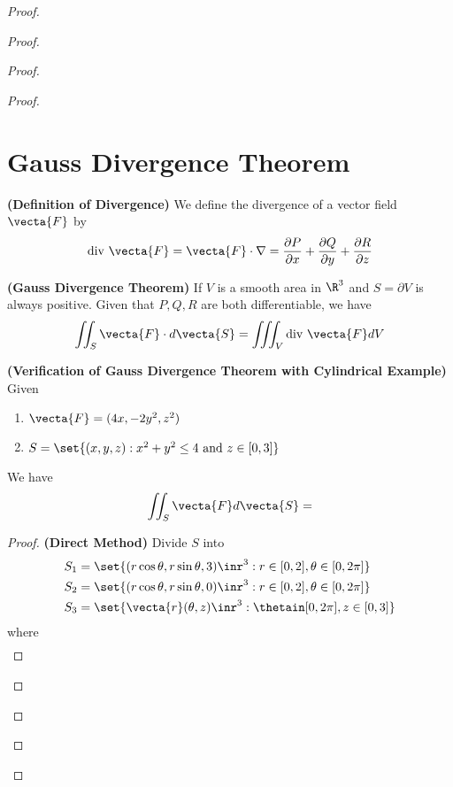 \documentclass{report}
\begin{document}
\begin{proof}
\begin{proof}
\begin{proof}
\begin{proof}
\section{Gauss Divergence Theorem}
\begin{definition}
\textbf{(Definition of Divergence)} We define the divergence of a vector field $\vecta{F}$ by 
\begin{align*}
\text{div }\vecta{F}= \vecta{F} \cdot \nabla = \frac{\partial P}{\partial x}+ \frac{\partial Q}{\partial y}+\frac{\partial R}{\partial z} 
\end{align*}
\end{definition}
\begin{theorem}
\textbf{(Gauss Divergence Theorem)} If $V$ is a smooth area in  $\R^3$ and  $S=\partial V$ is always positive. Given that $P,Q,R$ are both differentiable, we have 
 \begin{align*}
\iint_S \vecta{F}\cdot d\vecta{S}=\iiint_V \text{div }\vecta{F}dV
\end{align*}
\end{theorem}
\begin{theorem}
\textbf{(Verification of Gauss Divergence Theorem with Cylindrical Example)} Given 
\begin{enumerate}[label=(\alph*)]
  \item $\vecta{F}=(4x,-2y^2,z^2)$ 
  \item $S=\set{(x,y,z):x^2+y^2\leq 4 \text{ and } z\in [0,3]}$
\end{enumerate}
We have 
\begin{align*}
\iint_S \vecta{F} d\vecta{S}=
\end{align*}
\end{theorem}
\begin{proof}
\textbf{(Direct Method)}
Divide $S$ into 
 \begin{align*}
S_1&=\set{(r\cos \theta ,r \sin \theta,3)\inr^3:r\in [0,2], \theta \in [0,2\pi]}\\
S_2&=\set{(r\cos \theta,r \sin \theta ,0)\inr^3:r\in [0,2],\theta \in [0,2\pi]}\\
S_3&=\set{\vecta{r}(\theta,z)\inr^3: \thetain [0,2\pi],z\in [0,3]}
\end{align*}
where
\begin{align*}

\end{align*}
\end{proof}
\end{proof}
\end{proof}
\end{proof}
\end{proof}
\end{document}
